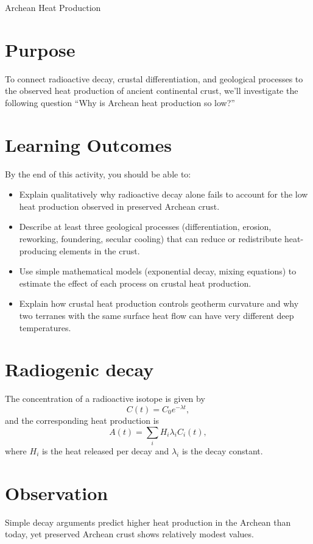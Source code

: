 \begin{activity}{Archean Heat Production}

\section*{Purpose}

To connect radioactive decay, crustal differentiation, and geological processes to the observed heat production of ancient continental crust, we'll investigate the following question ``Why is Archean heat production so low?''

{\color{red}
\section*{Learning Outcomes}

By the end of this activity, you should be able to:
\begin{itemize}
  \item Explain qualitatively why radioactive decay alone fails to account for the low heat production observed in preserved Archean crust.
  \item Describe at least three geological processes (differentiation, erosion, reworking, foundering, secular cooling) that can reduce or redistribute heat-producing elements in the crust.
  \item Use simple mathematical models (exponential decay, mixing equations) to estimate the effect of each process on crustal heat production.
  \item Explain how crustal heat production controls geotherm curvature and why two terranes with the same surface heat flow can have very different deep temperatures.
\end{itemize}
}

\section*{Radiogenic decay}
The concentration of a radioactive isotope is given by
\[
C(t) = C_0 e^{-\lambda t},
\]
and the corresponding heat production is
\[
A(t) = \sum_i H_i \lambda_i C_i(t),
\]
where $H_i$ is the heat released per decay and $\lambda_i$ is the decay constant.

\section*{Observation}
Simple decay arguments predict higher heat production in the Archean than today, yet preserved Archean crust shows relatively modest values.



\end{activity}

